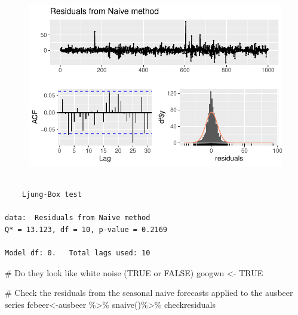 \documentclass[
  letterpaper,
  DIV=11,
  numbers=noendperiod]{scrartcl}
\newenvironment{Shaded}{\begin{snugshade}}{\end{snugshade}}
\newcommand{\CommentTok}[1]{\textcolor[rgb]{0.37,0.37,0.37}{#1}}
\newcommand{\ConstantTok}[1]{\textcolor[rgb]{0.56,0.35,0.01}{#1}}
\newcommand{\FunctionTok}[1]{\textcolor[rgb]{0.28,0.35,0.67}{#1}}
\newcommand{\NormalTok}[1]{\textcolor[rgb]{0.00,0.23,0.31}{#1}}
\newcommand{\OtherTok}[1]{\textcolor[rgb]{0.00,0.23,0.31}{#1}}
\newcommand{\SpecialCharTok}[1]{\textcolor[rgb]{0.37,0.37,0.37}{#1}}
\begin{document}
\begin{figure}[H]

{\centering \includegraphics{forecasting_datacamp_ex_files/figure-pdf/unnamed-chunk-8-1.pdf}

}

\end{figure}

\begin{verbatim}

    Ljung-Box test

data:  Residuals from Naive method
Q* = 13.123, df = 10, p-value = 0.2169

Model df: 0.   Total lags used: 10
\end{verbatim}

\begin{Shaded}
\begin{Highlighting}[]
\CommentTok{\# Do they look like white noise (TRUE or FALSE)}
\NormalTok{googwn }\OtherTok{\textless{}{-}} \ConstantTok{TRUE}

\CommentTok{\# Check the residuals from the seasonal naive forecasts applied to the ausbeer series}
\NormalTok{fcbeer}\OtherTok{\textless{}{-}}\NormalTok{ausbeer }\SpecialCharTok{\%\textgreater{}\%} \FunctionTok{snaive}\NormalTok{()}\SpecialCharTok{\%\textgreater{}\%}\NormalTok{ checkresiduals}
\end{Highlighting}
\end{Shaded}
\end{document}
